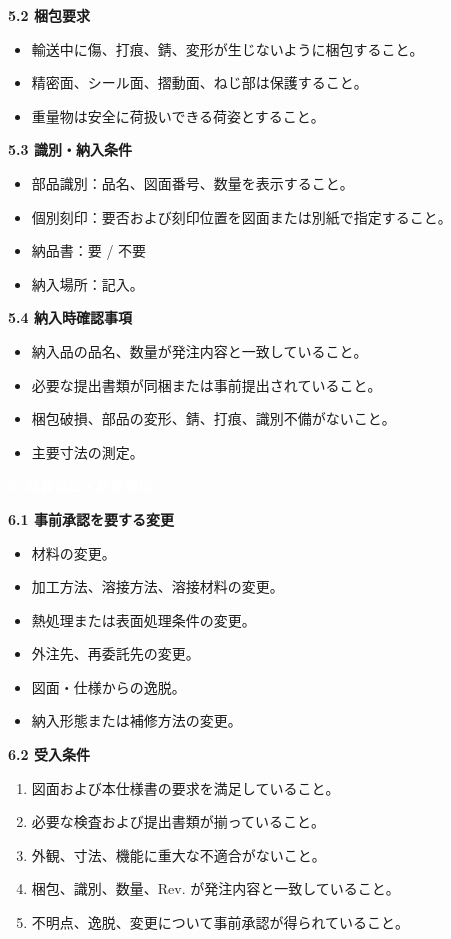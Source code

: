\documentclass[a4paper,10pt]{ltjsarticle}
\newlength{\SpecBodyWidth}
\newcommand{\PageTitle}[1]{%
  \vspace*{2mm}%
  \noindent\colorbox{SpecHead}{%
    \parbox{\dimexpr\SpecBodyWidth-2\fboxsep\relax}{%
      \large\bfseries\textcolor{white}{#1}%
    }%
  }%
  \par\vspace{5mm}%
}
\newcommand{\BlockTitle}[1]{%
  \vspace{4mm}%
  \noindent\colorbox{SpecSoft}{%
    \parbox{\dimexpr\SpecBodyWidth-2\fboxsep\relax}{%
      \normalsize\bfseries\textcolor{SpecHead}{#1}%
    }%
  }%
  \par\vspace{1.5mm}%
}
\begin{document}
\BlockTitle{5.2 梱包要求}
\begin{itemize}
  \item 輸送中に傷、打痕、錆、変形が生じないように梱包すること。
  \item 精密面、シール面、摺動面、ねじ部は保護すること。
  \item 重量物は安全に荷扱いできる荷姿とすること。
\end{itemize}

\BlockTitle{5.3 識別・納入条件}
\begin{itemize}
  \item 部品識別：品名、図面番号、数量を表示すること。
  \item 個別刻印：要否および刻印位置を図面または別紙で指定すること。
  \item 納品書：要 / 不要
  \item 納入場所：記入。
\end{itemize}

\BlockTitle{5.4 納入時確認事項}
\begin{itemize}
  \item 納入品の品名、数量が発注内容と一致していること。
  \item 必要な提出書類が同梱または事前提出されていること。
  \item 梱包破損、部品の変形、錆、打痕、識別不備がないこと。
  \item 主要寸法の測定。
\end{itemize}

\clearpage

\PageTitle{6. 品質保証・変更管理}

\BlockTitle{6.1 事前承認を要する変更}
\begin{itemize}
  \item 材料の変更。
  \item 加工方法、溶接方法、溶接材料の変更。
  \item 熱処理または表面処理条件の変更。
  \item 外注先、再委託先の変更。
  \item 図面・仕様からの逸脱。
  \item 納入形態または補修方法の変更。
\end{itemize}

\BlockTitle{6.2 受入条件}
\begin{enumerate}
  \item 図面および本仕様書の要求を満足していること。
  \item 必要な検査および提出書類が揃っていること。
  \item 外観、寸法、機能に重大な不適合がないこと。
  \item 梱包、識別、数量、Rev. が発注内容と一致していること。
  \item 不明点、逸脱、変更について事前承認が得られていること。
\end{enumerate}
\end{document}
